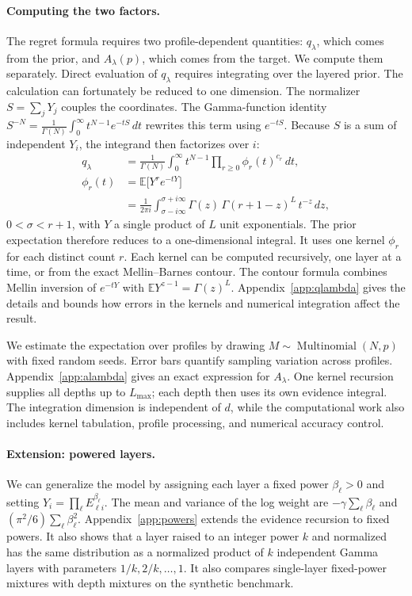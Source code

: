 \documentclass[anon]{alt2027}
\newcommand{\Mult}{\operatorname{Multinomial}}
\newcommand{\E}{\mathbb{E}}
\newcommand{\Lmax}{L_{\max}}
\begin{document}
\paragraph{Computing the two factors.} The regret formula requires two profile-dependent quantities: $q_\lambda$, which comes from the prior, and $A_\lambda(p)$, which comes from the target. We compute them separately. Direct evaluation of $q_\lambda$ requires integrating over the layered prior. The calculation can fortunately be reduced to one dimension. The normalizer $S=\sum_jY_j$ couples the coordinates. The Gamma-function identity $S^{-N}=\frac1{\Gamma(N)}\int_0^\infty t^{N-1}e^{-tS}\,dt$ rewrites this term using $e^{-tS}$. Because $S$ is a sum of independent $Y_i$, the integrand then factorizes over $i$:
\begin{align}
\label{eq:gammatrick}
q_\lambda&=\frac{1}{\Gamma(N)}\int_0^\infty t^{N-1}\prod_{r\ge0}\phi_r(t)^{c_r}\,dt,\\
\phi_r(t)&=\E\bigl[Y^r e^{-tY}\bigr]\nonumber\\
&=\frac{1}{2\pi i}\int_{\sigma-i\infty}^{\sigma+i\infty}\Gamma(z)\,\Gamma(r{+}1{-}z)^{L}\,t^{-z}\,dz,\nonumber
\end{align}
$0<\sigma<r+1$, with $Y$ a single product of $L$ unit exponentials. The prior expectation therefore reduces to a one-dimensional integral. It uses one kernel $\phi_r$ for each distinct count $r$. Each kernel can be computed recursively, one layer at a time, or from the exact Mellin--Barnes contour. The contour formula combines Mellin inversion of $e^{-tY}$ with $\E Y^{z-1}=\Gamma(z)^L$. Appendix~\ref{app:qlambda} gives the details and bounds how errors in the kernels and numerical integration affect the result. 

We estimate the expectation over profiles by drawing $M\sim\Mult(N,p)$ with fixed random seeds. Error bars quantify sampling variation across profiles. Appendix~\ref{app:alambda} gives an exact expression for $A_\lambda$. One kernel recursion supplies all depths up to $\Lmax$; each depth then uses its own evidence integral. The integration dimension is independent of $d$, while the computational work also includes kernel tabulation, profile processing, and numerical accuracy control.

\paragraph{Extension: powered layers.}
We can generalize the model by assigning each layer a fixed power $\beta_\ell>0$ and setting $Y_i=\prod_\ell E_{\ell i}^{\beta_\ell}$. The mean and variance of the log weight are $-\gamma\sum_\ell\beta_\ell$ and $(\pi^2/6)\sum_\ell\beta_\ell^2$. Appendix~\ref{app:powers} extends the evidence recursion to fixed powers. It also shows that a layer raised to an integer power $k$ and normalized has the same distribution as a normalized product of $k$ independent Gamma layers with parameters $1/k,2/k,\ldots,1$. It also compares single-layer fixed-power mixtures with depth mixtures on the synthetic benchmark.
\end{document}
